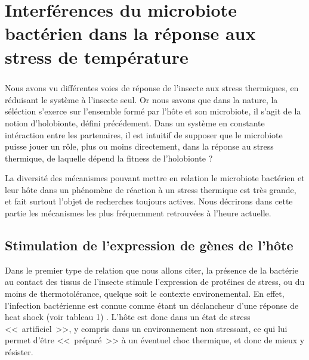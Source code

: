 \chapter{Interférences du microbiote bactérien dans la réponse aux stress de température} %

\paragraph{}
Nous avons vu différentes voies de réponse de l'insecte aux stress thermiques, en réduisant le système à l'insecte seul.
Or nous savons que dans la nature, la séléction s'exerce sur l'ensemble formé par l'hôte et son microbiote, il s'agit de la notion d'holobionte, défini précédement.
Dans un système en constante intéraction entre les partenaires, il est intuitif de supposer que le microbiote puisse jouer un rôle, plus ou moins directement, dans la réponse au stress thermique, de laquelle dépend la fitness de l'holobionte ?

La diversité des mécanismes pouvant mettre en relation le microbiote bactérien et leur hôte dans un phénomène de réaction à un stress thermique est très grande, et fait surtout l'objet de recherches toujours actives.
Nous décrirons dans cette partie les mécanismes les plus fréquemment retrouvées à l'heure actuelle.

\section{Stimulation de l'expression de gènes de l'hôte}

Dans le premier type de relation que nous allons citer, la présence de la bactérie au contact des tissus de l'insecte stimule l'expression de protéines de stress, ou du moins de thermotolérance, quelque soit le contexte environemental.
En effet, l'infection bactérienne est connue comme étant un déclancheur d'une réponse de heat shock (voir tableau 1) \cite{deitch1995}.
L'hôte est donc dans un état de stress <<~artificiel~>>, y compris dans un environnement non stressant, ce qui lui permet d'être <<~préparé~>> à un éventuel choc thermique, et donc de mieux y résister.

